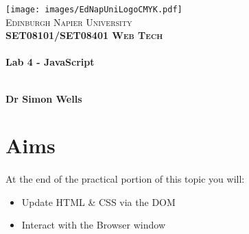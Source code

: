 \documentclass[10pt, a4paper]{article}
\begin{document}

\begin{titlepage}
\vspace*{5cm}
\begin{center}
\texttt{[image: images/EdNapUniLogoCMYK.pdf]}~\\[1cm]

\textsc{\Large Edinburgh Napier University}\\[1.5cm]

\textsc{\LARGE \bfseries SET08101/SET08401 Web Tech}\\[0.5cm]

\hrulefill \\[0.4cm]
{\huge \bfseries Lab 4 - JavaScript \\[0.4cm] }
\hrulefill \\[1.5cm]

\begin{minipage}{0.4\textwidth}
\begin{flushleft} \large
\textbf{Dr Simon Wells} \\
\end{flushleft}
\end{minipage}

\vfill

\end{center}
\end{titlepage}




%

\section{Aims}
\paragraph{} At the end of the practical portion of this topic you will:

\begin{itemize}
\item Update HTML \& CSS via the DOM
\item Interact with the Browser window
\end{itemize}
\end{document}
